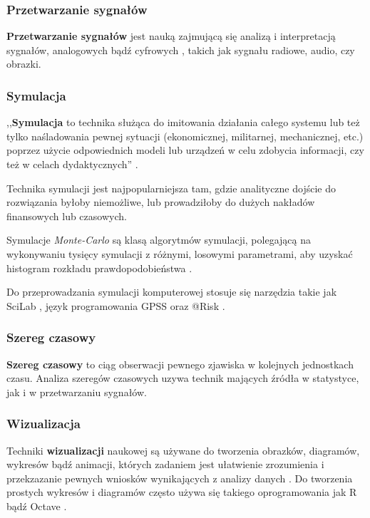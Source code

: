 \subsubsection{Przetwarzanie sygnałów}
\label{sub:przetwarzanie_sygnalow}
\textbf{Przetwarzanie sygnałów} jest nauką zajmującą się analizą i interpretacją sygnałów, analogowych bądź cyfrowych \cite{smith97}, takich jak sygnału radiowe, audio, czy obrazki.

\subsubsection{Symulacja}
\label{sub:symulacja}
,,\textbf{Symulacja} to technika służąca do imitowania działania całego systemu lub też tylko naśladowania pewnej sytuacji (ekonomicznej, militarnej, mechanicznej, etc.) poprzez użycie odpowiednich modeli lub urządzeń w celu zdobycia informacji, czy też w celach dydaktycznych'' \cite{www:symulacja}.

Technika symulacji jest najpopularniejsza tam, gdzie analityczne dojście do rozwiązania byłoby niemożliwe, lub prowadziłoby do dużych nakładów finansowych lub czasowych.

Symulacje \textit{Monte-Carlo} są klasą algorytmów symulacji, polegającą na wykonywaniu tysięcy symulacji z różnymi, losowymi parametrami, aby uzyskać histogram rozkładu prawdopodobieństwa \cite{math:monte-carlo}.

Do przeprowadzania symulacji komputerowej stosuje się narzędzia takie jak SciLab \cite{www:scilab}, język programowania GPSS \cite{www:gpss} oraz @Risk \cite{www:risk}.

\subsubsection{Szereg czasowy}
\label{sub:szereg_czasowy}
\textbf{Szereg czasowy} to ciąg obserwacji pewnego zjawiska w kolejnych jednostkach czasu. Analiza szeregów czasowych uzywa technik mających źródła w statystyce, jak i w przetwarzaniu sygnałów.

\subsubsection{Wizualizacja}
\label{sub:wizualizacja}
Techniki \textbf{wizualizacji} naukowej są używane do tworzenia obrazków, diagramów, wykresów bądź animacji, których zadaniem jest ułatwienie zrozumienia i przekzazanie pewnych wniosków wynikających z analizy danych \cite{lawrence1994}. Do tworzenia prostych wykresów i diagramów często używa się takiego oprogramowania jak R \cite{www:R} bądź Octave \cite{www:octave}.

